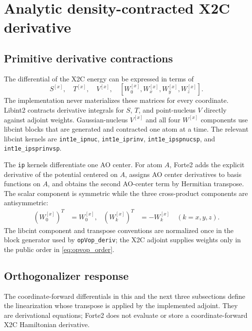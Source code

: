 \documentclass[aip,jcp,preprint]{revtex4-1}
\newcommand{\xcoord}{{[x]}}
\begin{document}
\section{Analytic density-contracted X2C derivative}

\subsection{Primitive derivative contractions}

The differential of the X2C energy can be expressed in terms of
\begin{equation}
 S^\xcoord,\quad T^\xcoord,\quad V^\xcoord,\quad
 [W_0^\xcoord,W_x^\xcoord,W_y^\xcoord,W_z^\xcoord].
 \label{eq:x2c_required_derivatives}
\end{equation}
The implementation never materializes these matrices for every coordinate.
Libint2 contracts derivative integrals for $S$, $T$, and point-nucleus $V$
directly against adjoint weights.  Gaussian-nucleus $V^\xcoord$ and all four
$W^\xcoord$ components use libcint blocks that are generated and contracted
one atom at a time.  The relevant libcint kernels are
\texttt{int1e\_ipnuc}, \texttt{int1e\_iprinv},
\texttt{int1e\_ipspnucsp}, and \texttt{int1e\_ipsprinvsp}.

The \texttt{ip} kernels differentiate one AO center.  For atom $A$, Forte2
adds the explicit derivative of the potential centered on $A$, assigns AO
center derivatives to basis functions on $A$, and obtains the second AO-center
term by Hermitian transpose.  The scalar component is symmetric while the
three cross-product components are antisymmetric:
\begin{align}
 (W_0^\xcoord)^T&=W_0^\xcoord, &
 (W_k^\xcoord)^T&=-W_k^\xcoord\quad(k=x,y,z).
\end{align}
The libcint component and transpose conventions are normalized once in the
block generator used by \texttt{opVop\_deriv}; the X2C adjoint supplies weights
only in the public order in \cref{eq:opvop_order}.

\subsection{Orthogonalizer response}

The coordinate-forward differentials in this and the next three subsections
define the linearization whose transpose is applied by the implemented
adjoint.  They are derivational equations; Forte2 does not evaluate or store a
coordinate-forward X2C Hamiltonian derivative.
\end{document}
